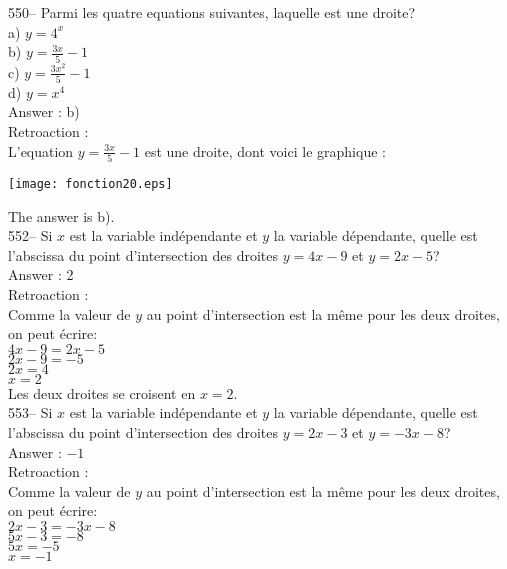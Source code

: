 ﻿\documentclass[letterpaper, 12pt]{article}
\begin{document}
550-- Parmi les quatre equations suivantes, laquelle est une droite?\\
a) $y=4^{x}$\\[2mm]
b) $y=\frac{3x}{5}-1$\\[2mm]
c) $y=\frac{3x^{2}}{5}-1$\\[2mm]
d) $y=x^{4}$\\

Answer : b)\\

Retroaction : \\
L'equation $y=\frac{3x}{5}-1$ est une droite, dont voici le
graphique : \\
    \begin{center}
    \texttt{[image: fonction20.eps]}
    \end{center}

The answer is b).\\


552-- Si $x$ est la variable ind\'ependante et $y$ la variable d\'ependante,
quelle est l'abscissa du point d'intersection des droites $y=4x-9$ et
$y=2x-5$?\\

Answer : 2\\

Retroaction : \\
Comme la valeur de $y$ au point d'intersection est la m\^eme pour les deux
droites, on peut \'ecrire:\\
$4x-9=2x-5$\\
$2x-9=-5$\\
$2x=4$\\
$x=2$\\

Les deux droites se croisent en $x=2$.\\

553-- Si $x$ est la variable ind\'ependante et $y$ la variable d\'ependante,
quelle est l'abscissa du point d'intersection des droites $y=2x-3$ et
$y=-3x-8$?\\

Answer : $-1$\\

Retroaction : \\
Comme la valeur de $y$ au point d'intersection est la m\^eme pour les deux
droites, on peut \'ecrire:\\
$2x-3=-3x-8$\\
$5x-3=-8$\\
$5x=-5$\\
$x=-1$\\
\end{document}
